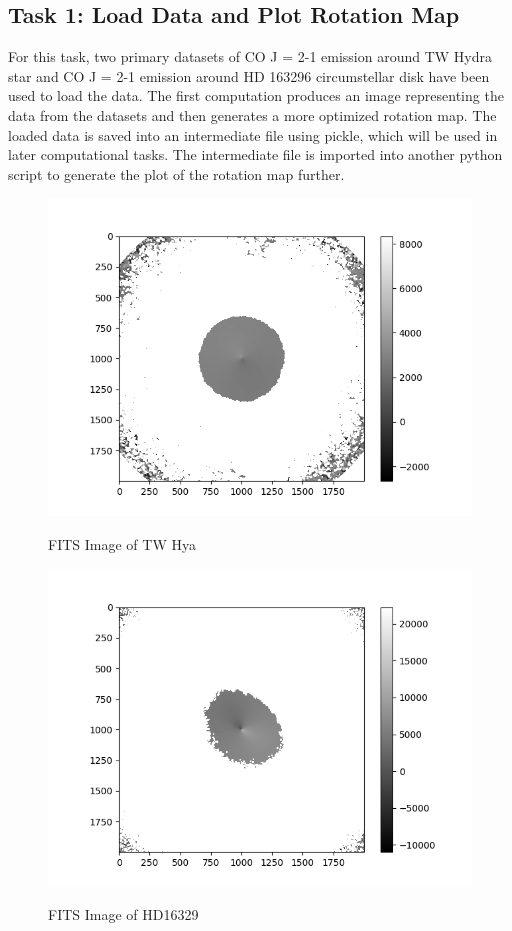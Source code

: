\documentclass{article}
\begin{document}
\subsection{Task 1: Load Data and Plot Rotation Map}
For this task, two primary datasets of CO J = 2-1 emission around TW Hydra star and CO J = 2-1 emission around HD 163296 circumstellar disk have been used to load the data. The first computation produces an image representing the data from the datasets and then generates a more optimized rotation map. The loaded data is saved into an intermediate file using pickle, which will be used in later computational tasks. The intermediate file is imported into another python script to generate the plot of the rotation map further. 
\begin{figure}
\caption{FITS Image of TW Hya}
\includegraphics[width=\textwidth,height=\textheight,keepaspectratio]{fits_image_TWHya}
\label{fig:fig 1}
\end{figure}

\begin{figure}
\caption{FITS Image of HD16329}
\includegraphics[width=\textwidth,height=\textheight,keepaspectratio]{fits_image_HD163296}
\label{fig:fig 2}
\end{figure}
\end{document}
